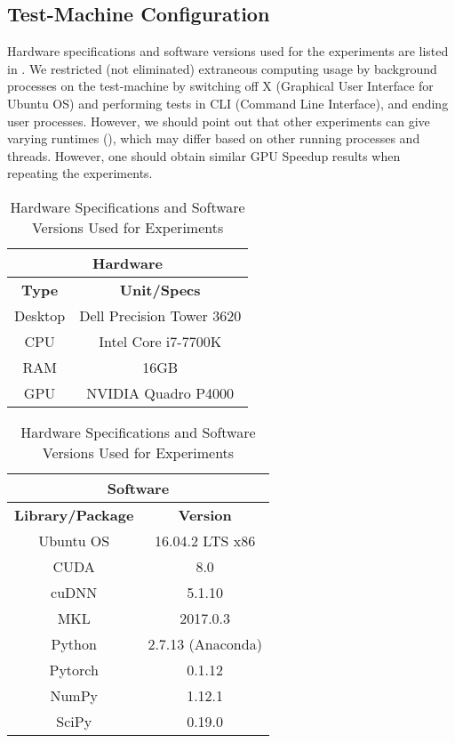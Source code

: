 \subsection{Test-Machine Configuration} \label{sec:Test-Machine Configuration}
Hardware specifications and software versions used for the experiments are listed in . We restricted (not eliminated) extraneous computing usage by background processes on the test-machine by switching off X (Graphical User Interface for Ubuntu OS) and performing tests in CLI (Command Line Interface), and ending user processes. However, we should point out that other experiments can give varying runtimes (), which may differ based on other running processes and threads. However, one should obtain similar GPU Speedup results when repeating the experiments.
\begin{table}[!htbp]
    \centering
    \caption{Hardware Specifications and Software Versions Used for Experiments}
    \label{tab:Hardware Specifications and Software Versions Used for Experiments}
    \begin{tabular}{|c|c|}
        \hline
        \multicolumn{2}{c}{\textbf{Hardware}}\\
        \hline
        \textbf{Type} & \textbf{Unit/Specs}\\
        \hline
        Desktop & Dell Precision Tower 3620\\
        CPU & Intel Core i7-7700K\footnotemark\\
        RAM & 16GB\\
        GPU & NVIDIA Quadro P4000\\
        \hline
    \end{tabular}\quad
    \begin{tabular}{|c|c|}
        \hline
        \multicolumn{2}{c}{\textbf{Software}}\\
        \hline
        \textbf{Library/Package} & \textbf{Version}\\
        \hline
        Ubuntu OS & 16.04.2 LTS x86\textunderscore64\\
        CUDA & 8.0\\
        cuDNN & 5.1.10\\
        MKL & 2017.0.3\\
        Python & 2.7.13 (Anaconda)\\
        Pytorch & 0.1.12\textunderscore2\\
        NumPy & 1.12.1\\
        SciPy & 0.19.0\\
        \hline
    \end{tabular}
\end{table}

